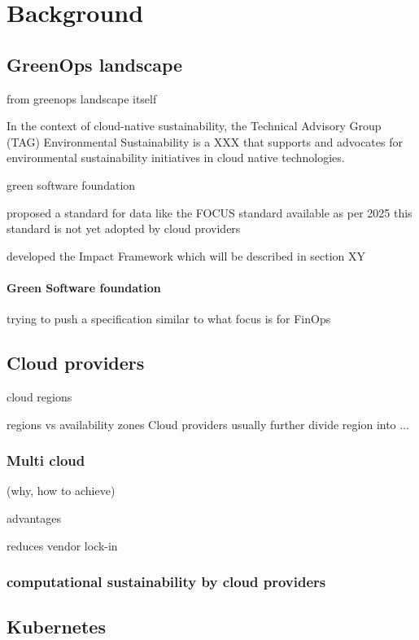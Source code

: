 \chapter{Background}
\label{cha:background}

\section{GreenOps landscape}


from greenops landscape itself

In the context of cloud-native sustainability,
the Technical Advisory Group (TAG) Environmental Sustainability is a XXX that supports and advocates for environmental sustainability initiatives in cloud native technologies.


green software foundation

proposed a standard for data like the FOCUS standard available 
as per 2025 this standard is not yet adopted by cloud providers

developed the Impact Framework which will be described in section XY

\subsubsection{Green Software foundation}

trying to push a specification similar to what focus is for FinOps



\section{Cloud providers}

cloud regions


regions vs availability zones
Cloud providers usually further divide region into ...


\subsection{Multi cloud}
(why, how to achieve)

advantages

reduces vendor lock-in


\subsection{computational sustainability by cloud providers}

\section{Kubernetes}


